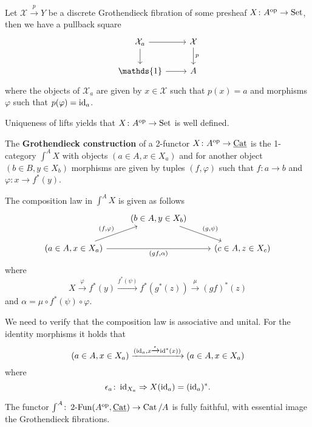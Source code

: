 \begin{Idea}
	Let $ \mathcal{ X } \xrightarrow{ p } Y $ be a discrete Grothendieck fibration of some presheaf $ X \colon A^{ \operatorname{op} } \to \operatorname{Set} $, then we have a pullback square
	\[
	\begin{tikzcd}
		\mathcal{ X }_a 
		\ar[r]
		\ar[d]
		&
		\mathcal{ X }
		\ar[d, " p"]
		\\
		\mathds{ 1 }
		\ar[r]
		&
		A
	\end{tikzcd}
	\]
	where the objects of $ \mathcal{ X }_a $ are given by $ x \in \mathcal{ X } $ such that $ p ( x ) = a $ and morphisms $ \varphi $ such that $ p ( \varphi ) = \operatorname{id}_a $.
	
	
	Uniqueness of lifts yields that $ X \colon A ^{ \operatorname{op} } \to \operatorname{Set} $ is well defined.
\end{Idea}

\begin{defi}
\label{Grothendieck_constr_defi}
	The \textbf{Grothendieck construction} of a 2-functor $ X \colon A^{ \operatorname{op} } \to \underline{\operatorname{Cat}} $ is the 1-category $ \int^A X $ with objects $ ( a \in A , x \in X_a ) $ and for another object $ ( b \in B , y \in X_b )$ morphisms are given by tuples $ ( f , \varphi ) $ such that $ f \colon a \to b $ and $ \varphi \colon x \to f^* ( y ) $.
	
	The composition law in $ \int^A X $ is given as follows
	\[
	\begin{tikzcd}	
		&
		( b \in A , y \in X_b )
		\ar[rd, "{ ( g , \psi ) }"]
		&
		\\
		(a \in A , x \in X_a )
		\ar[ru, "{ ( f , \varphi ) }"]
		\ar[rr, "{ ( gf , \alpha ) }"']
		&&
		( c \in A , z \in X_c )
	\end{tikzcd}
	\]
	where
	\[
		X \xrightarrow{ \varphi } f^* ( y ) \xrightarrow{ f^* ( \psi ) } f^* ( g^* ( z )) \xrightarrow{ \mu } ( gf )^*( z )
	\] 
	and $ \alpha = \mu \circ f^*(\psi ) \circ \varphi $.
\end{defi}

We need to verify that the composition law is associative and unital.
For the identity morphisms it holds that 
\[
	( a \in A , x \in X_a ) \xrightarrow{ ( \operatorname{id}_a , x \xrightarrow{ \epsilon } \operatorname{id}^* ( x ) ) } ( a \in A , x \in X_a ) 
\] 
where 
\[
	\epsilon_a \colon \operatorname{id}_{X_a } \Rightarrow X ( \operatorname{id}_a ) = ( \operatorname{id}_a )^*.
\]

\begin{thm}
	The functor $ \int^A \colon \operatorname{2-Fun} ( A^{ \operatorname{op} } , \underline{\operatorname{Cat} } ) \to \operatorname{Cat} /A $ is fully faithful, with essential image the Grothendieck fibrations.
\end{thm}

